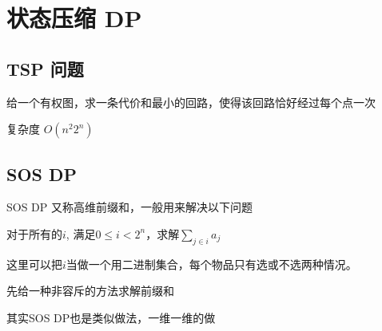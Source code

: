 \section{状态压缩 DP}

\subsection{TSP 问题}

给一个有权图，求一条代价和最小的回路，使得该回路恰好经过每个点一次

复杂度 $O(n^2 2^n)$


\subsection{SOS DP}

SOS DP 又称高维前缀和，一般用来解决以下问题
\begin{framed}
对于所有的$i$, 满足$0\le i < 2^n$，求解$\sum_{j \in i} a_j$
\end{framed}
这里可以把$i$当做一个用二进制集合，每个物品只有选或不选两种情况。

先给一种非容斥的方法求解前缀和


其实SOS DP也是类似做法，一维一维的做
